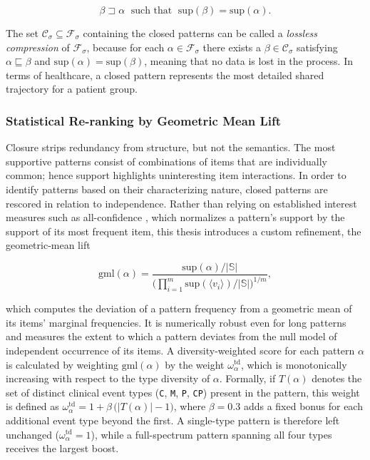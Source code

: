 \begin{equation}
    \beta \sqsupset \alpha \;\text{ such that }\; \mathrm{sup}(\beta) = \mathrm{sup}(\alpha).
    \label{eq:closed}
\end{equation}

The set $\mathcal{C}_\sigma \subseteq \mathcal{F}_\sigma$ containing the closed patterns can be called a \emph{lossless compression} of $\mathcal{F}_\sigma$, because for each $\alpha \in \mathcal{F}_\sigma$ there exists a $\beta \in \mathcal{C}_\sigma$ satisfying $\alpha \sqsubseteq \beta$ and $\mathrm{sup}(\alpha) = \mathrm{sup}(\beta)$, meaning that no data is lost in the process. In terms of healthcare, a closed pattern represents the most detailed shared trajectory for a patient group.

\subsubsection*{Statistical Re-ranking by Geometric Mean Lift}

Closure strips redundancy from structure, but not the semantics. The most supportive patterns consist of combinations of items that are individually common; hence support highlights uninteresting item interactions. In order to identify patterns based on their characterizing nature, closed patterns are rescored in relation to independence. Rather than relying on established interest measures such as all-confidence \cite{omiecinski2003}, which normalizes a pattern's support by the support of its most frequent item, this thesis introduces a custom refinement, the geometric-mean lift

\begin{equation}
    \mathrm{gml}(\alpha) = \frac{\mathrm{sup}(\alpha)/|\mathbb{S}|}{\bigl(\prod_{i=1}^{m} \mathrm{sup}(\langle v_i \rangle)/|\mathbb{S}|\bigr)^{1/m}},
    \label{eq:gml}
\end{equation}

which computes the deviation of a pattern frequency from a geometric mean of its items' marginal frequencies. It is numerically robust even for long patterns and measures the extent to which a pattern deviates from the null model of independent occurrence of its items. A diversity-weighted score for each pattern $\alpha$ is calculated by weighting $\mathrm{gml}(\alpha)$ by the weight $\omega_\alpha^{\mathrm{td}}$, which is monotonically increasing with respect to the type diversity of $\alpha$. Formally, if $T(\alpha)$ denotes the set of distinct clinical event types (\texttt{C}, \texttt{M}, \texttt{P}, \texttt{CP}) present in the pattern, this weight is defined as $\omega_\alpha^{\mathrm{td}} = 1 + \beta\,\bigl(|T(\alpha)| - 1\bigr)$, where $\beta = 0.3$ adds a fixed bonus for each additional event type beyond the first. A single-type pattern is therefore left unchanged ($\omega_\alpha^{\mathrm{td}} = 1$), while a full-spectrum pattern spanning all four types receives the largest boost.

